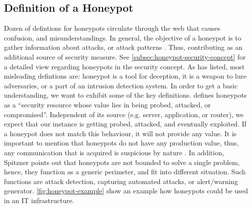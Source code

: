 \subsection{Definition of a Honeypot}

Dozen of defintions for honeypots circulate through the web that causes confusion, and misunderstandings.
In general, the objective of a honeypot is to gather information about attacks, or attack patterns \cite{NawrockiWSKS2016}.
Thus, contributing as an additional source of security measure.
See \autoref{subsec:honeypot-security-concept} for a detailed view regarding honeypots in the security concept.
As \citet{Spitzner2003} has listed, most misleading defintions are: honeypot is a tool for deception, it is a weapon to lure adversaries, or a part of an intrusion detection system.
In order to get a basic understanding, we want to exhibit some of the key definitions.
\citet{Spitzner2003} defines honeypots as a \enquote{security resource whose value lies in being probed, attacked, or compromised}. Independent of its source (e.g. server, application, or router), we expect that our instance is getting probed, attacked, and eventually exploited.
If a honeypot does not match this behaviour, it will not provide any value.
It is important to mention that honeypots do not have any production value, thus, any communication that is acquired is suspicious by nature \cite{Spitzner2003}.
In addition, Spitzner \citet{Spitzner2003} points out that honeypots are not bounded to solve a single problem, hence, they function as a generic perimeter, and fit into different situation.
Such functions are attack detection, capturing automated attacks, or alert/warning generator.
\autoref{fig:honeypot-example} show an example how honeypots could be used in an IT infrastructure.

